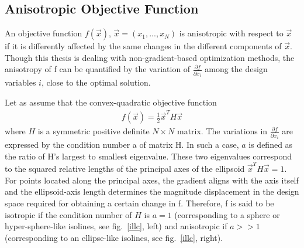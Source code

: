 
\subsection{Anisotropic Objective Function}
\label{IllCon}
An objective function $f(\vec{x})$, $\vec{x}=(x_1,...,x_N)$  is anisotropic with respect to $\vec{x}$ if it is differently affected by the same changes in the different components of $\vec{x}$. Though this thesis is dealing with non-gradient-based optimization methods, the anisotropy of f can be quantified by the variation of $\frac{\partial f}{\partial x_i}$ among the design variables $i$, close to the optimal solution. 



Let as assume that the convex-quadratic objective function
\begin{eqnarray}
   f(\vec{x}) = \frac{1}{2}\vec{x}^TH\vec{x}
   \label{conv.1}
\end{eqnarray}
where $H$ is a symmetric positive definite $N \times N$ matrix.
The variations in $\frac{\partial f}{\partial x_i}$  are expressed by the condition number a of matrix H. In such a case, $a$ is defined as the ratio of H's largest to smallest eigenvalue. 
These two eigenvalues correspond to the squared relative lengths of the principal axes of the ellipsoid $\vec{x}^TH\vec{x}\! =\! 1$. For points located along the principal axes, the gradient aligns with the axis itself and the ellipsoid-axis length determines the magnitude displacement in the design space required for obtaining a certain change in f. Therefore, f is said to be isotropic if the condition number of $H$ is $a=1$ (corresponding to a sphere or hyper-sphere-like isolines, see fig.\ \ref{illc}, left) and anisotropic if $a\!>>\!1$ (corresponding to an ellipse-like isolines, see fig.\ \ref{illc}, right).

  


